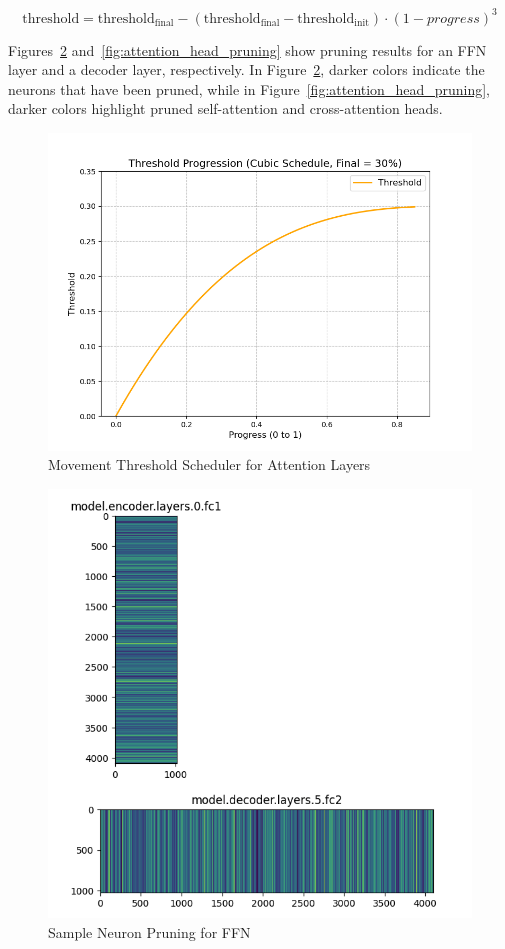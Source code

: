 \begin{equation}
    \text{threshold} = \text{threshold}_{\text{final}} - \left( \text{threshold}_{\text{final}} - \text{threshold}_{\text{init}} \right) \cdot (1 - progress)^3
\end{equation}


Figures~\ref{fig:neuron_pruning} and~\ref{fig:attention_head_pruning} show pruning results for an FFN layer and a decoder layer, respectively.
In Figure~\ref{fig:neuron_pruning}, darker colors indicate the neurons that have been pruned,
while in Figure~\ref{fig:attention_head_pruning}, darker colors highlight pruned self-attention and cross-attention heads.

\begin{figure}[hbpt]
    \centering
    \includegraphics[width=0.9\linewidth]{images/1}
    \caption{Movement Threshold Scheduler for Attention Layers}
    \label{fig:sub3}
\end{figure}

\begin{figure}[h!]
    \centering
    \includegraphics[width=0.9\linewidth]{images/pruning1}
    \caption{Sample Neuron Pruning for FFN}
    \label{fig:neuron_pruning}
\end{figure}

